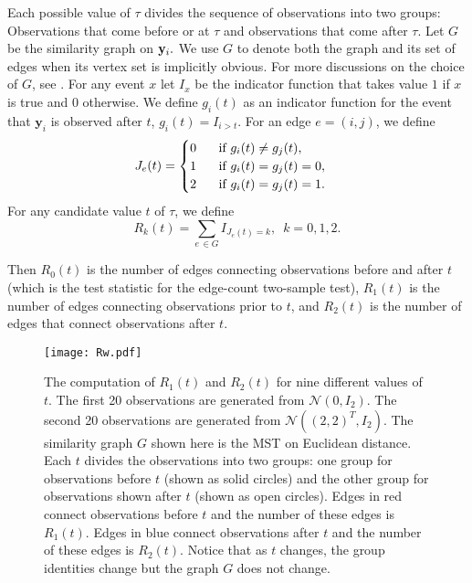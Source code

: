 \documentclass[arxiv, preprint]{imsart}
\numberwithin{equation}{section}
\theoremstyle{plain}
\begin{document}
Each possible value of $\tau$ divides the sequence of observations into two groups: Observations that come before or at $\tau$ and observations that come after $\tau$. Let $G$ be the similarity graph on ${\bf y}_i.$ We use $G$ to denote both the graph and its set of edges when its vertex set is implicitly obvious. For more discussions on the choice of $G$, see \cite{chen2015graph}. For any event $x$ let $I_x$ be the indicator function that takes value $1$ if $x$ is true and $0$ otherwise. We define $g_i(t)$ as an indicator function for the event that $\mathbf{y}_i$ is observed after $t$, $g_i(t) = I_{i > t}$. For an edge $e = (i,j)$, we define 
\begin{align*}
J_e(t) = \begin{cases}
0 \hspace{5mm} \text{ if } g_i(t) \neq g_j(t), \\
1 \hspace{5mm}\text{ if } g_i(t) = g_j(t) = 0, \\
2 \hspace{5mm}\text{ if } g_i(t) = g_j(t) = 1. \\
\end{cases}
\end{align*}
For any candidate value $t$ of $\tau$, we define 
\begin{equation}
R_k(t) = \sum_{e \, \in G} I_{J_e(t) = k}, \, \, \, k = 0,1,2. 
\end{equation}

Then $R_0(t)$ is the number of edges connecting observations before and after $t$ (which is the test statistic for the edge-count two-sample test), $R_1(t)$ is the number of edges connecting observations prior to $t$, and $R_2(t)$ is the number of edges that connect observations after $t$.

\begin{figure}
  \centering
    \texttt{[image: Rw.pdf]}
  \caption{The computation of $R_1(t)$ and $R_2(t)$ for nine different values of $t$. The first 20 observations are generated from $\mathcal{N}(0,I_2)$. The second 20 observations are generated from $\mathcal{N}((2,2)^T,I_2)$. The similarity graph $G$ shown here is the MST on Euclidean distance. Each $t$ divides the observations into two groups: one group for observations before $t$ (shown as solid circles) and the other group for observations shown after $t$ (shown as open circles). Edges in red connect observations before $t$ and the number of these edges is $R_1(t)$. Edges in blue connect observations after $t$ and the number of these edges is $R_2(t)$. Notice that as $t$ changes, the group identities change but the graph $G$ does not change.}
  \label{fig:Rw}
\end{figure}
\end{document}
